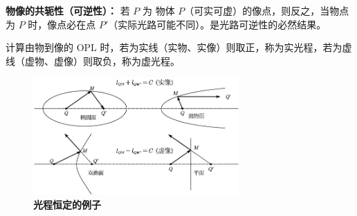 \documentclass[UTF8]{report}
\theoremstyle{MyLineTheoremStyle} %
\theoremstyle{MyBlockTheoremStyle} %
\theoremstyle{MySubsubsectionStyle} %
\begin{document}
\textbf{物像的共轭性（可逆性）：}
若 $P$ 为 物体 $P$（可实可虚）的像点，则反之，当物点为 $P$ 时，像点必在点 $P'$（实际光路可能不同）。是光路可逆性的必然结果。 

计算由物到像的 OPL 时，若为实线（实物、实像）则取正，称为实光程，若为虚线（虚物、虚像）则取负，称为虚光程。

\begin{figure}[H]\centering
\includegraphics[width=0.7\textwidth]{assets/path2.pdf}
\caption{\textbf{光程恒定的例子}}\label{光程恒定的例子}
\end{figure}
\end{document}
